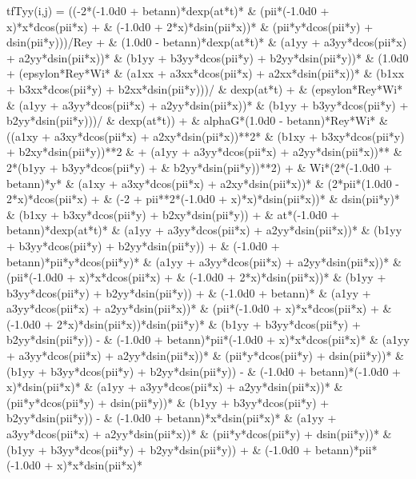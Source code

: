 \begin{fortrancode}[caption={Termos fontes}, label={cod:fortran-diffeq_2}]
       tfTyy(i,j) = ((-2*(-1.0d0 + betann)*dexp(at*t)*
     &    (pii*(-1.0d0 + x)*x*dcos(pii*x) + 
     &      (-1.0d0 + 2*x)*dsin(pii*x))*
     &    (pii*y*dcos(pii*y) + dsin(pii*y)))/Rey + 
     & (1.0d0 - betann)*dexp(at*t)*
     &  (a1yy + a3yy*dcos(pii*x) + a2yy*dsin(pii*x))*
     &  (b1yy + b3yy*dcos(pii*y) + b2yy*dsin(pii*y))*
     &  (1.0d0 + (epsylon*Rey*Wi*
     &       (a1xx + a3xx*dcos(pii*x) + a2xx*dsin(pii*x))*
     &       (b1xx + b3xx*dcos(pii*y) + b2xx*dsin(pii*y)))/
     &     dexp(at*t) + 
     &    (epsylon*Rey*Wi*
     &       (a1yy + a3yy*dcos(pii*x) + a2yy*dsin(pii*x))*
     &       (b1yy + b3yy*dcos(pii*y) + b2yy*dsin(pii*y)))/
     &     dexp(at*t)) + 
     & alphaG*(1.0d0 - betann)*Rey*Wi*
     &  ((a1xy + a3xy*dcos(pii*x) + a2xy*dsin(pii*x))**2*
     &     (b1xy + b3xy*dcos(pii*y) + b2xy*dsin(pii*y))**2 
     &     + (a1yy + a3yy*dcos(pii*x) + a2yy*dsin(pii*x))**
     &      2*(b1yy + b3yy*dcos(pii*y) + 
     &        b2yy*dsin(pii*y))**2) + 
     & Wi*(2*(-1.0d0 + betann)*y*
     &     (a1xy + a3xy*dcos(pii*x) + a2xy*dsin(pii*x))*
     &     (2*pii*(1.0d0 - 2*x)*dcos(pii*x) + 
     &       (-2 + pii**2*(-1.0d0 + x)*x)*dsin(pii*x))*
     &     dsin(pii*y)*
     &     (b1xy + b3xy*dcos(pii*y) + b2xy*dsin(pii*y)) + 
     &    at*(-1.0d0 + betann)*dexp(at*t)*
     &     (a1yy + a3yy*dcos(pii*x) + a2yy*dsin(pii*x))*
     &     (b1yy + b3yy*dcos(pii*y) + b2yy*dsin(pii*y)) + 
     &    (-1.0d0 + betann)*pii*y*dcos(pii*y)*
     &     (a1yy + a3yy*dcos(pii*x) + a2yy*dsin(pii*x))*
     &     (pii*(-1.0d0 + x)*x*dcos(pii*x) + 
     &       (-1.0d0 + 2*x)*dsin(pii*x))*
     &     (b1yy + b3yy*dcos(pii*y) + b2yy*dsin(pii*y)) + 
     &    (-1.0d0 + betann)*
     &     (a1yy + a3yy*dcos(pii*x) + a2yy*dsin(pii*x))*
     &     (pii*(-1.0d0 + x)*x*dcos(pii*x) + 
     &       (-1.0d0 + 2*x)*dsin(pii*x))*dsin(pii*y)*
     &     (b1yy + b3yy*dcos(pii*y) + b2yy*dsin(pii*y)) - 
     &    (-1.0d0 + betann)*pii*(-1.0d0 + x)*x*dcos(pii*x)*
     &     (a1yy + a3yy*dcos(pii*x) + a2yy*dsin(pii*x))*
     &     (pii*y*dcos(pii*y) + dsin(pii*y))*
     &     (b1yy + b3yy*dcos(pii*y) + b2yy*dsin(pii*y)) - 
     &    (-1.0d0 + betann)*(-1.0d0 + x)*dsin(pii*x)*
     &     (a1yy + a3yy*dcos(pii*x) + a2yy*dsin(pii*x))*
     &     (pii*y*dcos(pii*y) + dsin(pii*y))*
     &     (b1yy + b3yy*dcos(pii*y) + b2yy*dsin(pii*y)) - 
     &    (-1.0d0 + betann)*x*dsin(pii*x)*
     &     (a1yy + a3yy*dcos(pii*x) + a2yy*dsin(pii*x))*
     &     (pii*y*dcos(pii*y) + dsin(pii*y))*
     &     (b1yy + b3yy*dcos(pii*y) + b2yy*dsin(pii*y)) + 
     &    (-1.0d0 + betann)*pii*(-1.0d0 + x)*x*dsin(pii*x)*

\end{fortrancode}
